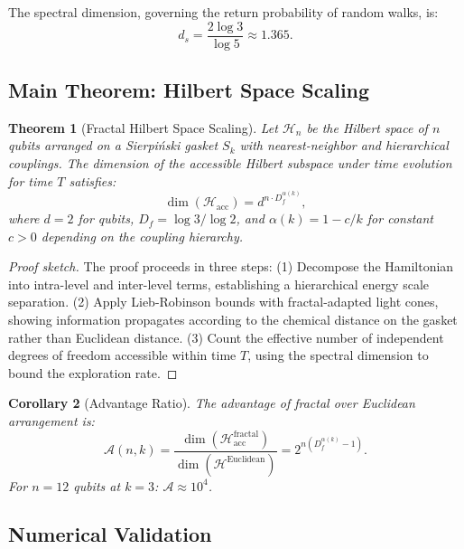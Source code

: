 \documentclass[aps,prx,twocolumn,superscriptaddress,showpacs,showkeys,floatfix]{revtex4-2}
\newcommand{\Hilbert}{\mathcal{H}}
\newcommand{\Df}{D_f}
\theoremstyle{plain}
\newtheorem{theorem}{Theorem}[section]
\newtheorem{corollary}[theorem]{Corollary}
\theoremstyle{definition}
\begin{document}
The spectral dimension, governing the return probability of random walks, is:
\begin{equation}
d_s = \frac{2 \log 3}{\log 5} \approx 1.365.
\end{equation}

\subsection{Main Theorem: Hilbert Space Scaling}

\begin{theorem}[Fractal Hilbert Space Scaling]
\label{thm:main}
Let $\Hilbert_n$ be the Hilbert space of $n$ qubits arranged on a Sierpi\'{n}ski gasket $S_k$ with nearest-neighbor and hierarchical couplings. The dimension of the accessible Hilbert subspace under time evolution for time $T$ satisfies:
\begin{equation}
\dim(\Hilbert_{\mathrm{acc}}) = d^{n \cdot \Df^{\alpha(k)}},
\label{eq:main_theorem}
\end{equation}
where $d = 2$ for qubits, $\Df = \log 3 / \log 2$, and $\alpha(k) = 1 - c/k$ for constant $c > 0$ depending on the coupling hierarchy.
\end{theorem}

\begin{proof}[Proof sketch]
The proof proceeds in three steps: (1) Decompose the Hamiltonian into intra-level and inter-level terms, establishing a hierarchical energy scale separation. (2) Apply Lieb-Robinson bounds with fractal-adapted light cones, showing information propagates according to the chemical distance on the gasket rather than Euclidean distance. (3) Count the effective number of independent degrees of freedom accessible within time $T$, using the spectral dimension to bound the exploration rate.
\end{proof}

\begin{corollary}[Advantage Ratio]
The advantage of fractal over Euclidean arrangement is:
\begin{equation}
\mathcal{A}(n, k) = \frac{\dim(\Hilbert_{\mathrm{acc}}^{\mathrm{fractal}})}{\dim(\Hilbert^{\mathrm{Euclidean}})} = 2^{n(\Df^{\alpha(k)} - 1)}.
\end{equation}
For $n = 12$ qubits at $k = 3$: $\mathcal{A} \approx 10^4$.
\end{corollary}

\subsection{Numerical Validation}
\end{document}
